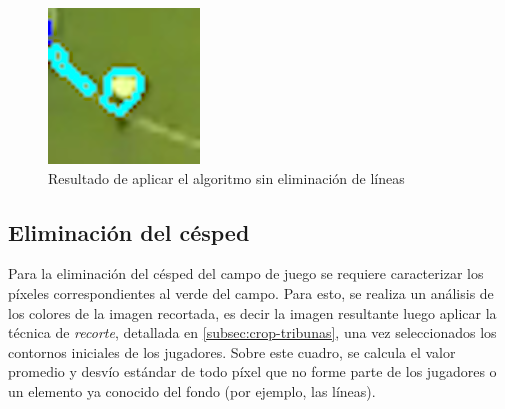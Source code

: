 \begin{figure}[H]
  \centering
    \begin{minipage}[t]{.45\textwidth}
      \includegraphics[width=\linewidth]{./images/confusion-linea.png}
      \caption{Resultado de aplicar el algoritmo sin eliminación de líneas
      \label{fig:confusion-linea}}
    \end{minipage}
\end{figure}

\subsection{Eliminación del césped}
\label{sec:cesped}

Para la eliminación del césped del campo de juego se requiere caracterizar los
píxeles correspondientes al verde del campo. Para esto, se realiza un análisis
de los colores de la imagen recortada, es decir la imagen resultante luego
aplicar la técnica de \textit{recorte}, detallada en
\ref{subsec:crop-tribunas}, una vez seleccionados los contornos iniciales de
los jugadores. Sobre este cuadro, se calcula el valor promedio y desvío
estándar de todo píxel que no forme parte de los jugadores o un elemento ya
conocido del fondo (por ejemplo, las líneas).

